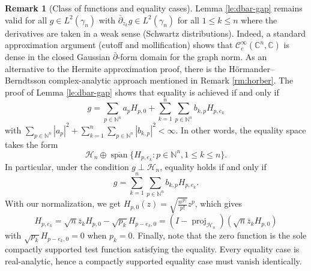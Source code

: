 \documentclass[11pt,reqno]{amsart}
\numberwithin{equation}{section}%
\numberwithin{figure}{section}%
\numberwithin{table}{section}
\theoremstyle{plain}
\theoremstyle{definition}
\newtheorem{remark}[theorem]{Remark}
\begin{document}
\begin{remark}[Class of functions and equality cases]
  Lemma \ref{le:dbar-gap} remains valid for all $g\in L^2(\gamma_n)$ with
  $\bar\partial_{z_k}g\in L^2(\gamma_n)$ for all $1\leq k\leq n$ where the
  derivatives are taken in a weak sense (Schwartz distributions). Indeed, a
  standard approximation argument (cutoff and mollification) shows that
  $\mathcal{C}^\infty_c(\mathbb{C}^n,\mathbb{C})$ is dense in the closed
  Gaussian $\bar\partial$-form domain for the graph norm. As an alternative to
  the Hermite approximation proof, there is the Hörmander--Berndtsson
  complex-analytic approach mentioned in Remark \ref{rm:horber}. The proof of
  Lemma \ref{le:dbar-gap} shows that equality is achieved if and only if
  \begin{equation}
    g=\sum_{p\in\mathbb{N}^n}a_pH_{p,0}+\sum_{k=1}^n\sum_{p\in\mathbb{N}^n}b_{k,p}H_{p,e_k}
  \end{equation}
  with
  $\sum_{p\in\mathbb{N}^n}|a_p|^2+\sum_{k=1}^n\sum_{p\in\mathbb{N}^n}|b_{k,p}|^2<\infty$.
  In other words, the equality space takes the form
  \begin{equation}
    \mathcal{H}_n\oplus\overline{\operatorname{span}}\{H_{p,e_k}:p\in\mathbb{N}^n,1\leq
    k\leq n\}.
  \end{equation}
  In particular, under the condition $g\perp\mathcal{H}_n$, equality holds if
  and only if
  \begin{equation}
    g=\sum_{k=1}^n\sum_{p\in\mathbb{N}^n}b_{k,p}H_{p,e_k}.
  \end{equation}
  With our normalization, we get $H_{p,0}(z)=\sqrt{\frac{n^{|p|}}{p!}}z^p$,
  which gives
  \begin{equation}
    H_{p,e_k}
    =\sqrt{n}\bar{z}_kH_{p,0}-\sqrt{p_k}H_{p-e_k,0}
    =(I-\operatorname{proj}_{\mathcal{H}_n})(\sqrt{n}\bar{z}_kH_{p,0})
  \end{equation}
  with $\sqrt{p_k}H_{p-e_k,0}=0$ when $p_k=0$. Finally, note that the zero
  function is the sole compactly supported test function satisfying the
  equality. Every equality case is real-analytic, hence a compactly supported
  equality case must vanish identically.
\end{remark}
\end{document}
